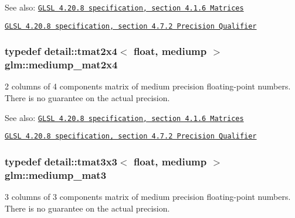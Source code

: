 \begin{Desc}
\item[See also:]\href{http://www.opengl.org/registry/doc/GLSLangSpec.4.20.8.pdf}{\tt GLSL 4.20.8 specification, section 4.1.6 Matrices} 

\href{http://www.opengl.org/registry/doc/GLSLangSpec.4.20.8.pdf}{\tt GLSL 4.20.8 specification, section 4.7.2 Precision Qualifier} \end{Desc}
\hypertarget{group__core__precision_ge90cf4be1ded03a3a5b7b42045da253c}{
\subsubsection[mediump\_\-mat2x4]{\setlength{\rightskip}{0pt plus 5cm}typedef detail::tmat2x4$<$ float, mediump $>$ {\bf glm::mediump\_\-mat2x4}}}
\label{group__core__precision_ge90cf4be1ded03a3a5b7b42045da253c}


2 columns of 4 components matrix of medium precision floating-point numbers. There is no guarantee on the actual precision.

\begin{Desc}
\item[See also:]\href{http://www.opengl.org/registry/doc/GLSLangSpec.4.20.8.pdf}{\tt GLSL 4.20.8 specification, section 4.1.6 Matrices} 

\href{http://www.opengl.org/registry/doc/GLSLangSpec.4.20.8.pdf}{\tt GLSL 4.20.8 specification, section 4.7.2 Precision Qualifier} \end{Desc}
\hypertarget{group__core__precision_gcf45e22f1fb2703b181995676963a1f9}{
\subsubsection[mediump\_\-mat3]{\setlength{\rightskip}{0pt plus 5cm}typedef detail::tmat3x3$<$ float, mediump $>$ {\bf glm::mediump\_\-mat3}}}
\label{group__core__precision_gcf45e22f1fb2703b181995676963a1f9}


3 columns of 3 components matrix of medium precision floating-point numbers. There is no guarantee on the actual precision.

